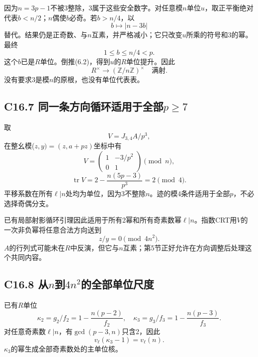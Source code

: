 {因为\ensuremath{n=3p-1}不被3整除，3属于这些安全数字。对任意模\ensuremath{n}单位\ensuremath{u}，取正平衡绝对代表\ensuremath{b<n/2}；\ensuremath{n}偶使\ensuremath{b}必奇。若\ensuremath{b>n/4}，以} \[
b\longmapsto |n-3b|
\tag{C16.6.2}
\] {替代。结果仍是正奇数、与\ensuremath{n}互素，并严格减小；它只改变\ensuremath{u}所乘的符号和3的幂。最终} \[
1\le b\le n/4<p.
\] {这个\ensuremath{b}已是\ensuremath{R}单位。倒推(6.2)，得到\ensuremath{u}的\ensuremath{R}单位提升。因此} \[
R^\times\longrightarrow(\mathbb Z/n\mathbb Z)^\times
\quad\text{满射}.
\tag{C16.6.3}
\] {没有要求3是模\ensuremath{n}的原根，也没有单位代表表。}

\subsection*{\texorpdfstring{{C16.7} {同一条方向循环适用于全部\ensuremath{p\ge 7}}}{C16.7 同一条方向循环适用于全部}}\label{C16-h119}

{取} \[
V=J_{3,4}A/p^3,
\] {在整幺模(\ensuremath{z,y)=(z,a+pz)}坐标中有} \[
V=\begin{pmatrix}1&-3/p^2\\0&1\end{pmatrix}\pmod n,
\] \[
\operatorname{tr}V=2-\frac{n(5p-3)}{p^3}=2\pmod4.
\tag{C16.7.1}
\] {平移系数在所有\ensuremath{\ell |n}处均为单位，因为3不整除\ensuremath{n}。迹的模4条件适用于全部\ensuremath{p}，不必选择奇偶分支。}

{已有局部射影循环引理因此适用于所有2幂和所有奇素数幂\ensuremath{\ell |n}。指数CRT用\ensuremath{V}的一次非负幂将任意合法方向送到} \[
z/y=0\pmod{4n^2}.
\tag{C16.7.2}
\] {\ensuremath{A}的行列式可能未在\ensuremath{R}中反演，但它与\ensuremath{n}互素；第5节正好允许在方向调整后处理这个共同内容。}

\subsection*{\texorpdfstring{{C16.8} {从\ensuremath{n}到\ensuremath{4n^{2}}的全部单位尺度}}{C16.8 从到的全部单位尺度}}\label{C16-h120}

{已有\ensuremath{R}单位} \[
\kappa_2=g_2/f_2=1-\frac{n(p-2)}{f_2},\quad
\kappa_3=g_3/f_3=1-\frac{n(p-3)}{f_3}.
\] {对任意奇素数\ensuremath{\ell |n}，有\ensuremath{\operatorname{gcd}(p-3,n)}只含2，因此} \[
v_\ell(\kappa_3-1)=v_\ell(n).
\] {\ensuremath{\kappa _{3}}的幂生成全部奇素数处的主单位核。}

